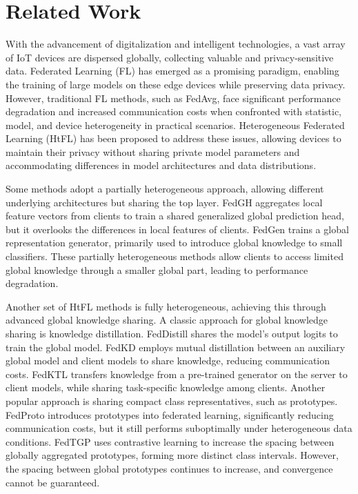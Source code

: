 \documentclass[journal]{IEEEtran}
\begin{document}
\section{Related Work}
With the advancement of digitalization and intelligent technologies, a vast array of IoT devices are dispersed globally, collecting valuable and privacy-sensitive data. Federated Learning (FL) has emerged as a promising paradigm, enabling the training of large models on these edge devices while preserving data privacy. However, traditional FL methods, such as FedAvg\cite{fedavg_google}, face significant performance degradation and increased communication costs when confronted with statistic, model, and device heterogeneity in practical scenarios. Heterogeneous Federated Learning (HtFL)\cite{tan2022fedproto} has been proposed to address these issues, allowing devices to maintain their privacy without sharing private model parameters and accommodating differences in model architectures and data distributions.

Some methods adopt a partially heterogeneous approach, allowing different underlying architectures but sharing the top layer. FedGH\cite{yi2023fedgh} aggregates local feature vectors from clients to train a shared generalized global prediction head, but it overlooks the differences in local features of clients. FedGen\cite{zhu2021data} trains a global representation generator, primarily used to introduce global knowledge to small classifiers. These partially heterogeneous methods allow clients to access limited global knowledge through a smaller global part, leading to performance degradation.

Another set of HtFL methods is fully heterogeneous, achieving this through advanced global knowledge sharing. A classic approach for global knowledge sharing is knowledge distillation. FedDistill\cite{jeong2018communication} shares the model's output logits to train the global model. FedKD\cite{wu2022communication} employs mutual distillation between an auxiliary global model and client models to share knowledge, reducing communication costs. FedKTL\cite{zhang2024upload} transfers knowledge from a pre-trained generator on the server to client models, while sharing task-specific knowledge among clients.
Another popular approach is sharing compact class representatives, such as prototypes. FedProto\cite{tan2022fedproto} introduces prototypes into federated learning, significantly reducing communication costs, but it still performs suboptimally under heterogeneous data conditions. FedTGP\cite{zhang2024fedtgp} uses contrastive learning to increase the spacing between globally aggregated prototypes, forming more distinct class intervals. However, the spacing between global prototypes continues to increase, and convergence cannot be guaranteed.
\end{document}
